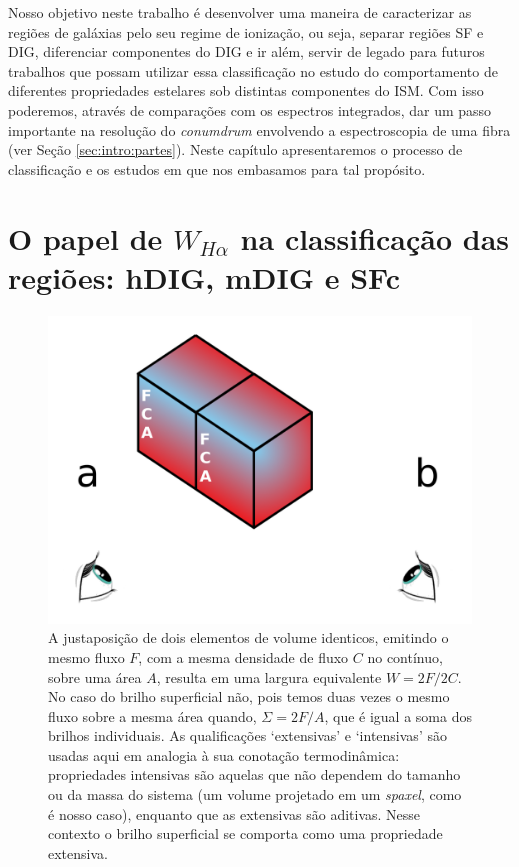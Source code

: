 Nosso objetivo neste trabalho é desenvolver uma maneira de caracterizar as regiões de galáxias pelo seu regime de ionização, ou seja, separar regiões SF e DIG, diferenciar componentes do DIG e ir além, servir de legado para futuros trabalhos que possam utilizar essa classificação no estudo do comportamento de diferentes propriedades estelares sob distintas componentes do ISM. Com isso poderemos, através de comparações com os espectros integrados, dar um passo importante na resolução do {\em conumdrum} envolvendo a espectroscopia de uma fibra (ver Seção \ref{sec:intro:partes}). Neste capítulo apresentaremos o processo de classificação e os estudos em que nos embasamos para tal propósito.

\section{O papel de $W_{H\alpha}$ na classificação das regiões: hDIG, mDIG e SFc}
\label{sec:DIGclass:WHa}

\begin{figure}
\includegraphics[scale=0.6]{figuras/cubo_com_fundo.pdf}
\caption[Intensive $\times$ extensive]
{A justaposição de dois elementos de volume identicos, emitindo o mesmo fluxo $F$, com a mesma densidade de fluxo $C$ no contínuo, sobre uma área $A$, resulta em uma largura equivalente $W = 2F/2C$. No caso do brilho superficial não, pois temos duas vezes o mesmo fluxo sobre a mesma área quando, $\Sigma = 2F/A$, que é igual a soma dos brilhos individuais. As qualificações `extensivas' e `intensivas' são usadas aqui em analogia à sua conotação termodinâmica: propriedades intensivas são aquelas que não dependem do tamanho ou da massa do sistema (um volume projetado em um {\em spaxel}, como é nosso caso), enquanto que as extensivas são aditivas. Nesse contexto o brilho superficial se comporta como uma propriedade extensiva.}
 \label{fig:intensive_vs_extensive}
\end{figure}

